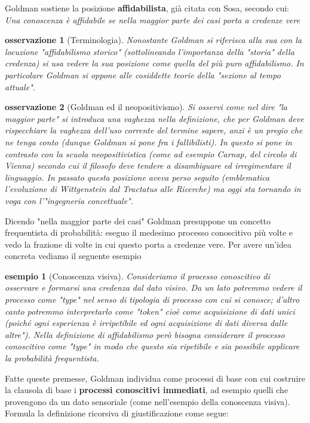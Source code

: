 \documentclass[10pt,a4paper]{article}
\newtheorem{esempio}{esempio}
\newtheorem{osservazione}{osservazione}
\begin{document}
Goldman sostiene la posizione \textbf{affidabilista}, già citata con Sosa, secondo cui:\\
\textit{Una conoscenza è affidabile se nella maggior parte dei casi porta a credenze vere}
\begin{osservazione}[Terminologia]
	Nonostante Goldman si riferisca alla sua con la locuzione "affidabilismo storico" (sottolineando l'importanza della "storia" della credenza) si usa vedere la sua posizione come quella del più puro affidabilismo. In particolare Goldman si oppone alle cosiddette teorie della "sezione al tempo attuale".
\end{osservazione}
\begin{osservazione}[Goldman ed il neopositivismo]
	Si osservi come nel dire "la maggior parte" si introduca una vaghezza nella definizione, che per Goldman deve rispecchiare la vaghezza dell'uso corrente del termine sapere, anzi è un pregio che ne tenga conto (dunque Goldman si pone fra i fallibilisti). In questo si pone in contrasto con la scuola neopositivistica (come ad esempio Carnap, del circolo di Vienna) secondo cui il filosofo deve tendere a disambiguare ed irregimentare il linguaggio. In passato questa posizione aveva perso seguito (emblematica l'evoluzione di Wittgenstein dal Tractatus alle Ricerche) ma oggi sta tornando in voga con l'"ingegneria concettuale".
\end{osservazione}
  Dicendo "nella maggior parte dei casi" Goldman presuppone un concetto frequentista di probabilità: eseguo il medesimo processo conoscitivo più volte e vedo la frazione di volte in cui questo porta a credenze vere. Per avere un'idea concreta vediamo il seguente esempio
\begin{esempio}[Conoscenza visiva]
	Consideriamo il processo conoscitivo di osservare e formarsi una credenza dal dato visivo. Da un lato potremmo vedere il processo come "type" nel senso di tipologia di processo con cui si conosce; d'altro canto potremmo interpretarlo come "token" cioè come acquisizione di dati unici (poiché ogni esperienza è irripetibile ed ogni acquisizione di dati diversa dalle altre"). Nella definizione di affidabilismo però bisogna considerare il processo conoscitivo come "type" in modo che questo sia ripetibile e sia possibile applicare la probabilità frequentista.
\end{esempio}
Fatte queste premesse, Goldman individua come processi di base con cui costruire la clausola di base i \textbf{processi conoscitivi immediati}, ad esempio quelli che provengono da un dato sensoriale (come nell'esempio della conoscenza visiva). Formula la definizione ricorsiva di giustificazione come segue:
\end{document}
